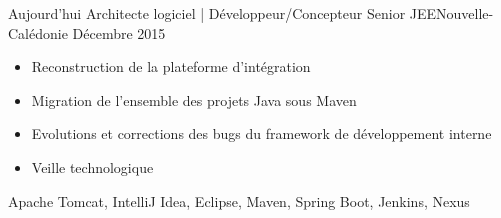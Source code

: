 %
%
%


\begin{experiences}
  \experience
    {Aujourd'hui}   {Architecte logiciel | Développeur/Concepteur Senior JEE}{Nouvelle-Calédonie}
    {Décembre 2015} {
                      \begin{itemize}
                        \item Reconstruction de la plateforme d'intégration                        
                        \item Migration de l'ensemble des projets Java sous Maven                    
                        \item Evolutions et corrections des bugs du framework de développement interne                
                        \item Veille technologique                                                                    
                      \end{itemize}
                    }
                    {Apache Tomcat, IntelliJ Idea, Eclipse, Maven, Spring Boot, Jenkins, Nexus}
  \emptySeparator
\end{experiences}